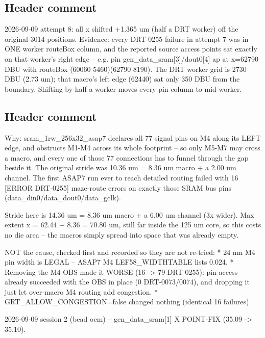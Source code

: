 \begin{record}

\subsection*{Header comment}

\begin{textblock}
2026-09-09 attempt 8: all x shifted +1.365 um (half a DRT worker) off the
original 3014 positions. Evidence: every DRT-0255 failure in attempt 7 was in
ONE worker routeBox column, and the reported source access points sat exactly on
that worker's right edge -- e.g. pin gen_data_sram[3]/dout0[4] ap at x=62790 DBU
with routeBox (60060 5460)(62790 8190). The DRT worker grid is 2730 DBU (2.73 um);
that macro's left edge (62440) sat only 350 DBU from the boundary. Shifting by half
a worker moves every pin column to mid-worker.
\end{textblock}

\subsection*{Header comment}

\begin{textblock}

Why: sram_1rw_256x32_asap7 declares all 77 signal pins on M4 along its LEFT
edge, and obstructs M1-M4 across its whole footprint -- so only M5-M7 may
cross a macro, and every one of those 77 connections has to funnel through the
gap beside it. The original stride was 10.36 um = 8.36 um macro + a 2.00 um
channel. The first ASAP7 run ever to reach detailed routing failed with 16
[ERROR DRT-0255] maze-route errors on exactly those SRAM bus pins
(data_din0/data_dout0/data_gclk).

Stride here is 14.36 um = 8.36 um macro + a 6.00 um channel (3x wider).
Max extent x = 62.44 + 8.36 = 70.80 um, still far inside the 125 um core, so
this costs no die area -- the macros simply spread into space that was already
empty.

NOT the cause, checked first and recorded so they are not re-tried:
  * 24 nm M4 pin width is LEGAL -- ASAP7 M4 LEF58_WIDTHTABLE lists 0.024.
  * Removing the M4 OBS made it WORSE (16 -> 79 DRT-0255): pin access already
    succeeded with the OBS in place (0 DRT-0073/0074), and dropping it just let
    over-macro M4 routing add congestion.
  * GRT_ALLOW_CONGESTION=false changed nothing (identical 16 failures).

2026-09-09 session 2 (bead ocm) -- gen_data_sram[1] X POINT-FIX (35.09 -> 35.10).


\end{textblock}
\end{record}
